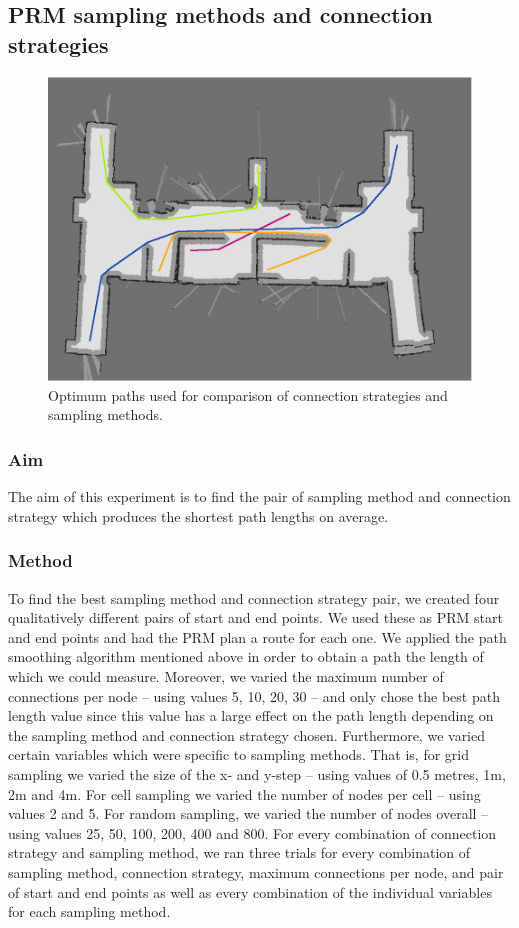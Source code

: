 \documentclass[conference]{IEEEtran}
\begin{document}
\subsection{PRM sampling methods and connection strategies}
\begin{figure}
  \includegraphics[width=\columnwidth]{optimumpaths}
  \caption{Optimum paths used for comparison of connection strategies and sampling methods.}
  \label{fig:optimum}
\end{figure}
\subsubsection{Aim}
The aim of this experiment is to find the pair of sampling method and connection strategy which produces the shortest path lengths on average.
\subsubsection{Method}
To find the best sampling method and connection strategy pair, we created four qualitatively different pairs of start and end points. We used these as PRM start and end points and had the PRM plan a route for each one. We applied the path smoothing algorithm mentioned above in order to obtain a path the length of which we could measure. Moreover, we varied the maximum number of connections per node -- using values 5, 10, 20, 30 -- and only chose the best path length value since this value has a large effect on the path length depending on the sampling method and connection strategy chosen. Furthermore, we varied certain variables which were specific to sampling methods. That is, for grid sampling we varied the size of the x- and y-step -- using values of 0.5 metres, 1m, 2m and 4m. For cell sampling we varied the number of nodes per cell -- using values 2 and 5. For random sampling, we varied the number of nodes overall -- using values 25, 50, 100, 200, 400 and 800. For every combination of connection strategy and sampling method, we ran three trials for every combination of sampling method, connection strategy, maximum connections per node, and pair of start and end points as well as every combination of the individual variables for each sampling method.
\end{document}
